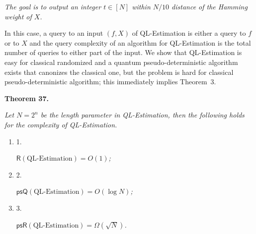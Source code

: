 \emph{The goal is to output an integer $t\in[N]$ within $N/10$ distance of the Hamming weight of $X$.}\par






In this case, a query to an input $(f,X)$ of QL-Estimation is either a query to $f$ or to $X$ and the query complexity of an algorithm for QL-Estimation is the total number of queries to either part of the input. We show that QL-Estimation is easy for classical randomized and a quantum pseudo-deterministic algorithm exists that canonizes the classical one, but the problem is hard for classical pseudo-deterministic algorithm; this immediately implies Theorem 3.\par





\par\medskip\noindent\textbf{
\textbf{Theorem 37}\textbf{.}
}\par



\emph{Let $N=2^{n}$ be the length parameter in QL-Estimation, then the following holds for the complexity of QL-Estimation.}\par


\begin{enumerate}


\item[] 
1. 


$\mathsf{R}({\text{QL-Estimation}})=O(1)$\emph{;}\par





\item[] 
2. 


$\mathsf{psQ}({\text{QL-Estimation}})=O(\log N)$\emph{;}\par





\item[] 
3. 


$\mathsf{psR}({\text{QL-Estimation}})=\Omega(\sqrt{N})$\emph{.}\par





\end{enumerate}


